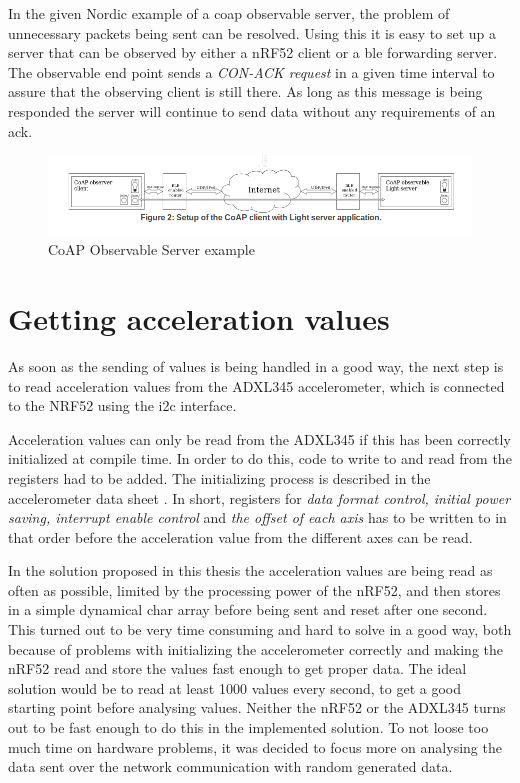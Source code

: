 In the given Nordic example of a \gls{coap} observable server, the problem of unnecessary packets being sent can be resolved. Using this it is easy to set up a server that can be observed by either a nRF52 client or a \gls{ble} forwarding server. The observable end point sends a \textit{CON-ACK request} in a given time interval to assure that the observing client is still there. As long as this message is being responded the server will continue to send data without any requirements of an \gls{ack}. 

\begin{figure}[ht]
    \centering
    \includegraphics[scale=0.47]{CoAPObservalbFigure2.png}    
    \caption{CoAP Observable Server example}
    \label{fig:CoAPexample2}
\end{figure}





\section{Getting acceleration values}

As soon as the sending of values is being handled in a good way, the next step is to read acceleration values from the ADXL345 accelerometer, which is connected to the NRF52 using the \gls{i2c} interface. 

Acceleration values can only be read from the ADXL345 if this has been correctly initialized at compile time. In order to do this, code to write to and read from the registers had to be added. The initializing process is described in the accelerometer data sheet \cite{adxlDataSheet}. In short, registers for \textit{data format control, initial power saving, interrupt enable control} and \textit{the offset of each axis} has to be written to in that order before the acceleration value from the different axes can be read.  

In the solution proposed in this thesis the acceleration values are being read as often as possible, limited by the processing power of the nRF52, and then stores in a simple dynamical char array before being sent and reset after one second. This turned out to be very time consuming and hard to solve in a good way, both because of problems with initializing the accelerometer correctly and making the nRF52 read and store the values fast enough to get proper data. The ideal solution would be to read at least 1000 values every second, to get a good starting point before analysing values. Neither the nRF52 or the ADXL345 turns out to be fast enough to do this in the implemented solution.  To not loose too much time on hardware problems, it was decided to focus more on analysing the data sent over the network communication with random generated data. 


